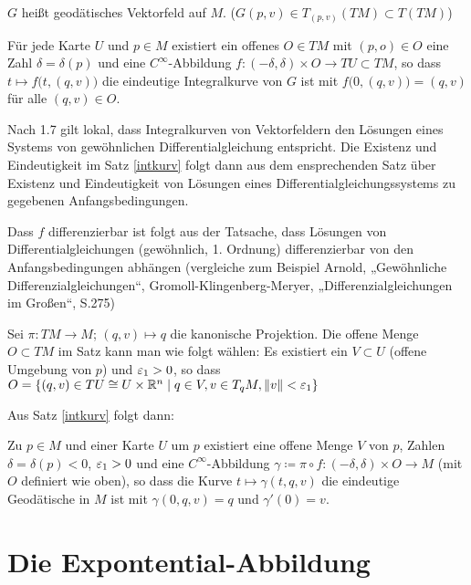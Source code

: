 \documentclass[a4paper,twoside,DIV15,BCOR12mm]{scrbook}
\renewcommand{\da}{\coloneqq}
\begin{document}
\begin{definition}
$G$ heißt geodätisches Vektorfeld auf $M$. ($G(p,v) \in T_{(p,v)}(TM) \subset T(TM)$)
\end{definition}

\begin{satz}
Für jede Karte $U$ und $p\in M$ existiert ein offenes $O\in TM$ mit $(p,o)\in O$ eine Zahl $\delta = \delta(p)$ und eine $C^\infty$-Abbildung $f: (-\delta,\delta)\times O \to TU\subset TM$, so dass $t \mapsto f\big(t,(q,v)\big)$ die eindeutige Integralkurve von $G$ ist mit $f\big(0,(q,v)\big)=(q,v)$ für alle $(q,v)\in O$.
\label{intkurv}
\end{satz}

\begin{beweis}
Nach 1.7 gilt lokal, dass Integralkurven von Vektorfeldern den Lösungen eines Systems von gewöhnlichen Differentialgleichung entspricht.
Die Existenz und Eindeutigkeit im Satz \ref{intkurv} folgt dann aus dem ensprechenden Satz über Existenz und Eindeutigkeit von Lösungen eines Differentialgleichungssystems zu gegebenen Anfangsbedingungen.

Dass $f$ differenzierbar ist folgt aus der Tatsache, dass Lösungen von Differentialgleichungen (gewöhnlich, 1. Ordnung) differenzierbar von den Anfangsbedingungen abhängen (vergleiche zum Beispiel Arnold, „Gewöhnliche Differenzialgleichungen“, Gromoll-Klingenberg-Meryer, „Differenzialgleichungen im Großen“, S.275)

Sei $\pi: TM\to M$; $(q,v)\mapsto q$ die kanonische Projektion. Die offene Menge $O\subset TM$ im Satz kann man wie folgt wählen: Es existiert ein $V\subset U$ (offene Umgebung von $p$) und $\varepsilon_1>0$, so dass $O=\{(q,v)\in TU \cong U\times \mathbb{R}^n \mid q \in V, v\in T_qM, \|v\|<\varepsilon_1\}$
\end{beweis}

Aus Satz \ref{intkurv} folgt dann:
\begin{satz}
\label{lokgeo}
Zu $p\in M$ und einer Karte $U$ um $p$ existiert eine offene Menge $V$ von $p$, Zahlen $\delta=\delta(p)<0$, $\varepsilon_1>0$  und eine $C^\infty$-Abbildung 
$\gamma \da \pi \circ f : (-\delta, \delta) \times O \to M$ (mit $O$ definiert wie oben), so dass die Kurve $t\mapsto \gamma(t,q,v)$ die  eindeutige Geodätische in $M$ ist mit $\gamma(0,q,v)=q$ und $\gamma'(0)=v$.
\end{satz}

\section{Die Expontential-Abbildung}
\end{document}
